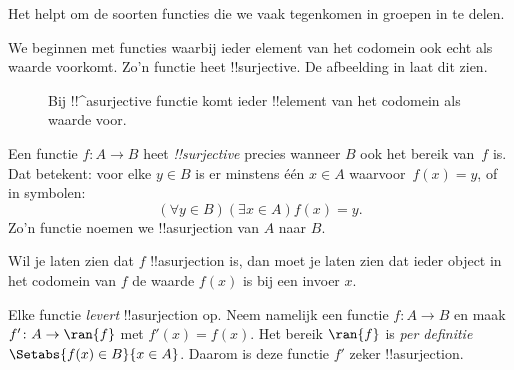 \documentclass[openany]{memoir}
\begin{document}
\begingroup
\def\olfilename{OLP-0022}
\def\olfilepath{content/sets-functions-relations/functions/}
\hypertarget{unit-OLP-0022}{}




\begin{explain}
Het helpt om de soorten functies die we vaak tegenkomen in groepen in
te delen.

We beginnen met functies waarbij ieder element van het codomein ook
echt als waarde voorkomt. Zo'n functie heet !!{surjective}. De
afbeelding in  laat dit zien.

\begin{figure}
  \caption{Bij !!^a{surjective} functie komt ieder !!{element} van het
    codomein als waarde voor.}
\end{figure}
\end{explain}

\begin{defn}
Een functie $f \colon A \rightarrow B$ heet \emph{!!{surjective}}
precies wanneer $B$ ook het bereik van~$f$ is. Dat betekent: voor elke
$y \in B$ is er minstens één $x \in A$ waarvoor~$f(x) = y$, of in
symbolen:
\[
  (\forall y \in B)(\exists x \in A)f(x) = y.
\]
Zo'n functie noemen we !!a{surjection} van $A$ naar $B$.
\end{defn}

\begin{explain}
Wil je laten zien dat $f$ !!a{surjection} is, dan moet je laten zien
dat ieder object in het codomein van $f$ de waarde $f(x)$ is bij een
invoer $x$.

Elke functie \emph{levert} !!a{surjection} op. Neem namelijk een
functie $f \colon A \to B$ en maak $f' \colon A \to \ran{f}$ met
$f'(x) = f(x)$. Het bereik $\ran{f}$ is \emph{per definitie}
$\Setabs{f(x) \in B}{x \in A}$. Daarom is deze functie $f'$ zeker
!!a{surjection}.
\end{explain}
\end{document}
